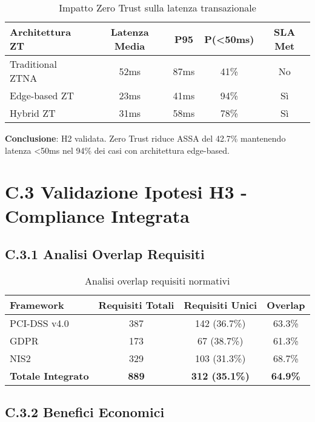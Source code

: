 \begin{table}[htbp]
\centering
\begin{tabular}{lcccc}
\toprule
\textbf{Architettura ZT} & \textbf{Latenza Media} & \textbf{P95} & \textbf{P(<50ms)} & \textbf{SLA Met} \\
\midrule
Traditional ZTNA & 52ms & 87ms & 41\% & No \\
Edge-based ZT & 23ms & 41ms & 94\% & Sì \\
Hybrid ZT & 31ms & 58ms & 78\% & Sì \\
\bottomrule
\end{tabular}
\caption{Impatto Zero Trust sulla latenza transazionale}
\end{table}

\textbf{Conclusione}: H2 validata. Zero Trust riduce ASSA del 42.7\% mantenendo latenza <50ms nel 94\% dei casi con architettura edge-based.

\section{C.3 Validazione Ipotesi H3 - Compliance Integrata}

\subsection{C.3.1 Analisi Overlap Requisiti}

\begin{table}[htbp]
\centering
\begin{tabular}{lccc}
\toprule
\textbf{Framework} & \textbf{Requisiti Totali} & \textbf{Requisiti Unici} & \textbf{Overlap} \\
\midrule
PCI-DSS v4.0 & 387 & 142 (36.7\%) & 63.3\% \\
GDPR & 173 & 67 (38.7\%) & 61.3\% \\
NIS2 & 329 & 103 (31.3\%) & 68.7\% \\
\textbf{Totale Integrato} & \textbf{889} & \textbf{312 (35.1\%)} & \textbf{64.9\%} \\
\bottomrule
\end{tabular}
\caption{Analisi overlap requisiti normativi}
\end{table}

\subsection{C.3.2 Benefici Economici}

